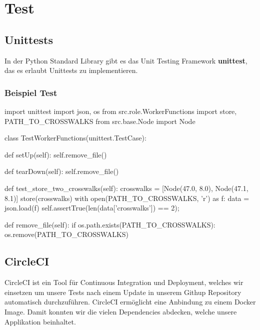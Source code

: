 \section{Test}
\subsection{Unittests}
In der Python Standard Library gibt es das Unit Testing Framework \textbf{unittest}, das es erlaubt Unittests zu implementieren.

\subsubsection{Beispiel Test}
\begin{python}
import unittest
import json, os
from src.role.WorkerFunctions import store, PATH_TO_CROSSWALKS
from src.base.Node import Node

class TestWorkerFunctions(unittest.TestCase):

    def setUp(self):
        self.remove_file()

    def tearDown(self):
        self.remove_file()
        
    def test_store_two_crosswalks(self):
        crosswalks = [Node(47.0, 8.0), Node(47.1, 8.1)]
        store(crosswalks)
        with open(PATH_TO_CROSSWALKS, 'r') as f:
            data = json.load(f)
        self.assertTrue(len(data['crosswalks']) == 2);
        
    def remove_file(self):
        if os.path.exists(PATH_TO_CROSSWALKS):
            os.remove(PATH_TO_CROSSWALKS) 
\end{python}
\subsection{CircleCI}
\Gls{CircleCI}\cite{circleci} ist ein Tool für Continuous Integration und Deployment, welches wir einsetzen um unsere Tests nach einem Update in unserem Githup Repository automatisch durchzuführen. CircleCI ermöglicht eine Anbindung zu einem Docker Image. Damit konnten wir die vielen Dependencies abdecken, welche unsere Applikation beinhaltet.
